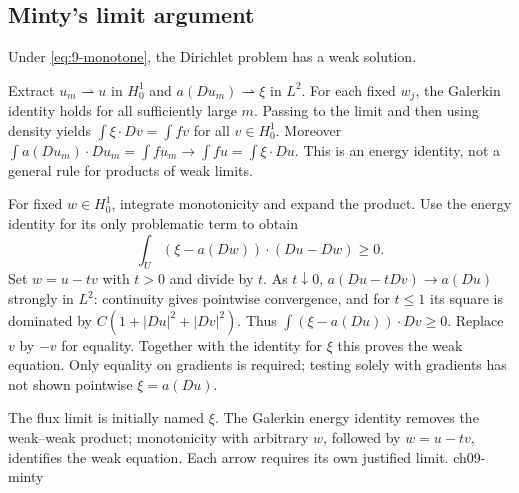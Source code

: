\subsection{Minty's limit argument}
\Needspace{50mm}
\begin{theorem}
Under \eqref{eq:9-monotone}, the Dirichlet problem has a weak solution.
\end{theorem}
\begin{expandedproof}
Extract $u_m\rightharpoonup u$ in $H^1_0$ and
$a(Du_m)\rightharpoonup\xi$ in $L^2$. For each fixed $w_j$, the Galerkin
identity holds for all sufficiently large $m$. Passing to the limit and then
using density yields $\int\xi\cdot Dv=\int fv$ for all $v\in H^1_0$.
Moreover $\int a(Du_m)\cdot Du_m=\int fu_m\to\int fu=\int\xi\cdot Du$.
This is an energy identity, not a general rule for products of weak limits.

For fixed $w\in H^1_0$, integrate monotonicity and expand the product.
Use the energy identity for its only problematic term to obtain
\[
 \int_U(\xi-a(Dw))\cdot(Du-Dw)\geq0.
\]
Set $w=u-tv$ with $t>0$ and divide by $t$. As $t\downarrow0$,
$a(Du-tDv)\to a(Du)$ strongly in $L^2$: continuity gives pointwise
convergence, and for $t\leq1$ its square is dominated by
$C(1+|Du|^2+|Dv|^2)$. Thus
$\int(\xi-a(Du))\cdot Dv\geq0$. Replace $v$ by $-v$ for equality.
Together with the identity for $\xi$ this proves the weak equation.
Only equality on gradients is required; testing solely with gradients
has not shown pointwise $\xi=a(Du)$.
\end{expandedproof}
{The flux limit is initially named $\xi$. The Galerkin energy identity removes the weak--weak product; monotonicity with arbitrary $w$, followed by $w=u-tv$, identifies the weak equation. Each arrow requires its own justified limit.}
{ch09-minty}
\Needspace{42mm}

\Needspace{40mm}
